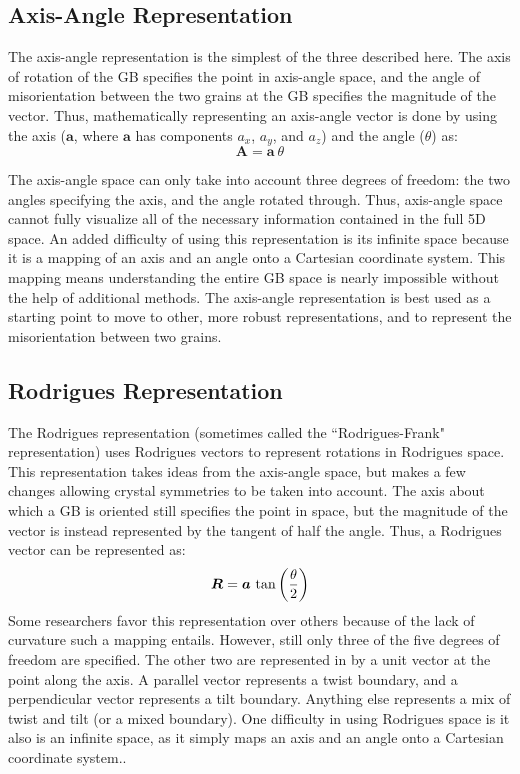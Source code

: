 \documentclass[12pt]{report}
\begin{document}
\subsection{Axis-Angle Representation}
The axis-angle representation is the simplest of the three described here.  The axis of rotation of the GB specifies the point in axis-angle space, and the angle of misorientation between the two grains at the GB specifies the magnitude of the vector.  Thus, mathematically representing an axis-angle vector is done by using the axis ($\bm{a}$, where $\bm{a}$ has components $a_x$, $a_y$, and $a_z$) and the angle ($\theta$) as:
\begin{equation}
\bm{A} = \bm{a}\ \theta
\label{eq:aaVec}
\end{equation} 

The axis-angle space can only take into account three degrees of freedom: the two angles specifying the axis, and the angle rotated through.  Thus, axis-angle space cannot fully visualize all of the necessary information contained in the full 5D space.\cite{frank1988} An added difficulty of using this representation is its infinite space because it is a mapping of an axis and an angle onto a Cartesian coordinate system.  This mapping means understanding the entire GB space is nearly impossible without the help of additional methods.  The axis-angle representation is best used as a starting point to move to other, more robust representations, and to represent the misorientation between two grains.\cite{randle2000}

\subsection{Rodrigues Representation}
The Rodrigues representation (sometimes called the ``Rodrigues-Frank" representation) uses Rodrigues vectors to represent rotations in Rodrigues space.  This representation takes ideas from the axis-angle space, but makes a few changes allowing crystal symmetries to be taken into account.  The axis about which a GB is oriented still specifies the point in space, but the magnitude of the vector is instead represented by the tangent of half the angle. Thus, a Rodrigues vector can be represented as:\cite{morawiec1996, becker1989, frank1988, randle2000, priester2013}
\begin{equation}
\bm{R}=\bm{a}\ \textnormal{tan}\left(\frac{\theta}{2}\right)
\label{eq:rodriguesVec}
\end{equation}
Some researchers favor this representation over others because of the lack of curvature such a mapping entails.\cite{frank1988, randle2000}  However, still only three of the five degrees of freedom are specified.  The other two are represented in  by a unit vector at the point along the axis. A parallel vector represents a twist boundary, and a perpendicular vector represents a tilt boundary.  Anything else represents a mix of twist and tilt (or a mixed boundary).  One difficulty in using Rodrigues space is it also is an infinite space, as it simply maps an axis and an angle onto a Cartesian coordinate system.\cite{frank1988, kirch2008}.
\end{document}
